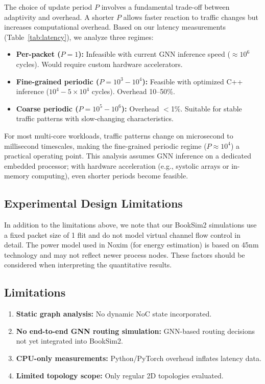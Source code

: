 \documentclass[conference]{IEEEtran}
\begin{document}
The choice of update period $P$ involves a fundamental trade-off between adaptivity and overhead. A shorter $P$ allows faster reaction to traffic changes but increases computational overhead. Based on our latency measurements (Table~\ref{tab:latency}), we analyze three regimes:

\begin{itemize}
    \item \textbf{Per-packet ($P=1$):} Infeasible with current GNN inference speed ($\approx 10^6$ cycles). Would require custom hardware accelerators.
    \item \textbf{Fine-grained periodic ($P=10^3{-}10^4$):} Feasible with optimized C++ inference ($10^4{-}5\times10^4$ cycles). Overhead 10--50\%.
    \item \textbf{Coarse periodic ($P=10^5{-}10^6$):} Overhead $<$1\%. Suitable for stable traffic patterns with slow-changing characteristics.
\end{itemize}

For most multi-core workloads, traffic patterns change on microsecond to millisecond timescales, making the fine-grained periodic regime ($P \approx 10^4$) a practical operating point. This analysis assumes GNN inference on a dedicated embedded processor; with hardware acceleration (e.g., systolic arrays or in-memory computing), even shorter periods become feasible.

\subsection{Experimental Design Limitations}

In addition to the limitations above, we note that our BookSim2 simulations use a fixed packet size of 1 flit and do not model virtual channel flow control in detail. The power model used in Noxim (for energy estimation) is based on 45nm technology and may not reflect newer process nodes. These factors should be considered when interpreting the quantitative results.

\subsection{Limitations}

\begin{enumerate}
    \item \textbf{Static graph analysis:} No dynamic NoC state incorporated.
    \item \textbf{No end-to-end GNN routing simulation:} GNN-based routing decisions not yet integrated into BookSim2.
    \item \textbf{CPU-only measurements:} Python/PyTorch overhead inflates latency data.
    \item \textbf{Limited topology scope:} Only regular 2D topologies evaluated.
\end{enumerate}
\end{document}
